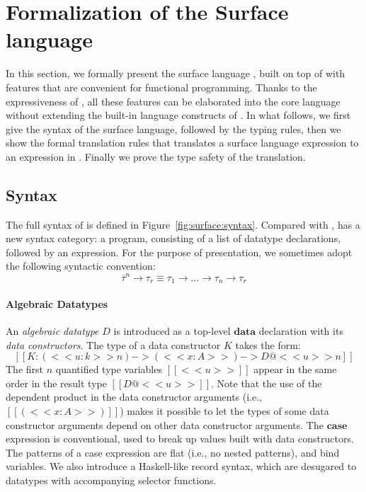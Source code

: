\section{Formalization of the Surface language}
\label{sec:surface}


In this section, we formally present the surface language \sufcc,
built on top of \name with features that are convenient for functional
programming. Thanks to the expressiveness of \name, all these features
can be elaborated into the core language without extending the
built-in language constructs of \name. In what follows, we first give
the syntax of the surface language, followed by the typing rules, then
we show the formal translation rules that translates a surface
language expression to an expression in \name. Finally we prove the
type safety of the translation.

\subsection{Syntax}

The full syntax of \sufcc is defined in
Figure~\ref{fig:surface:syntax}. Compared with \name, \sufcc has a new
syntax category: a program, consisting of a list of datatype
declarations, followed by an expression. For the purpose of
presentation, we sometimes adopt the following syntactic convention:
\[
\overline{\tau}^n \rightarrow \tau_r \equiv \tau_1 \rightarrow \dots \rightarrow \tau_n \rightarrow \tau_r
\]

\paragraph{Algebraic Datatypes}
An \emph{algebraic datatype} $D$ is introduced as a top-level
$\mathbf{data}$ declaration with its \emph{data constructors}. The type
of a data constructor $K$ takes the form:
\[
[[K : (<<u:k>>n) -> (<<x : A>>) -> D@<<u>>n]]
\]
The first $n$ quantified type variables $[[<<u>>]]$ appear in the same
order in the result type $[[D@<<u>>]]$.  Note that the use of the
dependent product in the data constructor arguments (i.e.,
$[[(<<x:A>>)]]$) makes it possible to let the types of some data
constructor arguments depend on other data constructor arguments.
The $\mathbf{case}$ expression is conventional, used to break up values
built with data constructors.  The patterns of a case expression are
flat (i.e., no nested patterns), and bind variables.
We also introduce a Haskell-like record syntax,
which are desugared to datatypes with accompanying selector functions.

